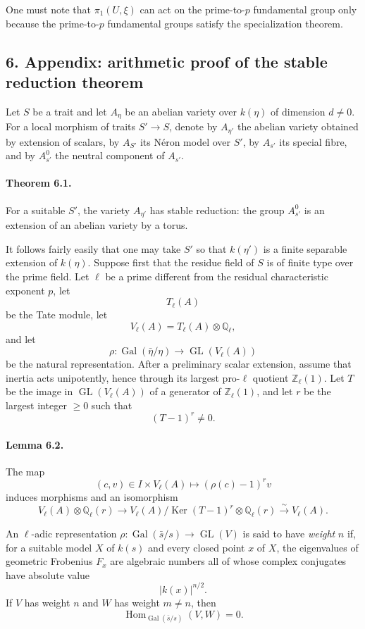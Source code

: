 \documentclass[11pt]{article}
\theoremstyle{plain}
\theoremstyle{definition}
\theoremstyle{remark}
\newcommand{\QQ}{\mathbb Q}
\newcommand{\ZZ}{\mathbb Z}
\DeclareMathOperator{\Hom}{Hom}
\DeclareMathOperator{\Ker}{Ker}
\DeclareMathOperator{\Gal}{Gal}
\DeclareMathOperator{\GL}{GL}
\newcommand{\longto}{\longrightarrow}
\begin{document}
One must note that $\pi_1(U,\xi)$ can act on the prime-to-$p$ fundamental group only because the prime-to-$p$ fundamental groups satisfy the specialization theorem.

\subsection*{6. Appendix: arithmetic proof of the stable reduction theorem}

Let $S$ be a trait and let $A_\eta$ be an abelian variety over $k(\eta)$ of dimension $d\neq0$. For a local morphism of traits $S'\to S$, denote by $A_{\eta'}$ the abelian variety obtained by extension of scalars, by $A_{S'}$ its Néron model over $S'$, by $A_{s'}$ its special fibre, and by $A^0_{s'}$ the neutral component of $A_{s'}$.

\paragraph{Theorem 6.1.}
For a suitable $S'$, the variety $A_{\eta'}$ has stable reduction: the group $A^0_{s'}$ is an extension of an abelian variety by a torus.

It follows fairly easily that one may take $S'$ so that $k(\eta')$ is a finite separable extension of $k(\eta)$. Suppose first that the residue field of $S$ is of finite type over the prime field. Let $\ell$ be a prime different from the residual characteristic exponent $p$, let
\[
T_\ell(A)
\]
be the Tate module, let
\[
V_\ell(A)=T_\ell(A)\otimes\QQ_\ell,
\]
and let
\[
\rho:\Gal(\bar\eta/\eta)\to\GL(V_\ell(A))
\]
be the natural representation. After a preliminary scalar extension, assume that inertia acts unipotently, hence through its largest pro-$\ell$ quotient $\ZZ_\ell(1)$. Let $T$ be the image in $\GL(V_\ell(A))$ of a generator of $\ZZ_\ell(1)$, and let $r$ be the largest integer $\geq0$ such that
\[
(T-1)^r\neq0.
\]

\paragraph{Lemma 6.2.}
The map
\[
(c,v)\in I\times V_\ell(A)\longmapsto (\rho(c)-1)^r v
\]
induces morphisms and an isomorphism
\[
V_\ell(A)\otimes\QQ_\ell(r)
\longto
V_\ell(A)/\Ker(T-1)^r\otimes\QQ_\ell(r)
\overset{\sim}{\longto}
V_\ell(A).
\tag{6.2.1}
\]

An $\ell$-adic representation $\rho:\Gal(\bar s/s)\to\GL(V)$ is said to have \emph{weight} $n$ if, for a suitable model $X$ of $k(s)$ and every closed point $x$ of $X$, the eigenvalues of geometric Frobenius $F_x$ are algebraic numbers all of whose complex conjugates have absolute value
\[
|k(x)|^{n/2}.
\]
If $V$ has weight $n$ and $W$ has weight $m\neq n$, then
\[
\Hom_{\Gal(\bar s/s)}(V,W)=0.
\]
\end{document}
